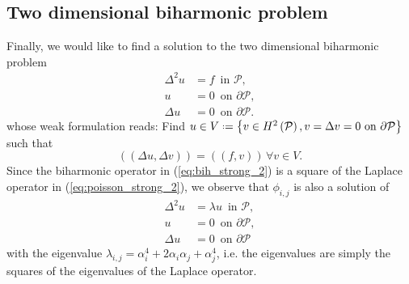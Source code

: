 \documentclass[a4paper,10pt]{article}
\newcommand{\Inner}[2]{\ensuremath{\left(\left(#1, #2\right)\right)}}
\newcommand*{\defeq}{\mathrel{\vcenter{\baselineskip0.5ex \lineskiplimit0pt
                     \hbox{\scriptsize.}\hbox{\scriptsize.}}}%
                     =}
\begin{document}
  \subsection{Two dimensional biharmonic problem}
  Finally, we would like to find a solution to the two dimensional biharmonic
  problem
  \begin{equation}
  \label{eq:bih_strong_2}
  \begin{aligned}
    \Delta^2 u &= f\,\text{ in }\mathcal{P},\\
            u &= 0\,\text{ on }\partial\mathcal{P},\\
    \Delta u &= 0\,\text{ on }\partial\mathcal{P}.
  \end{aligned}
  \end{equation}
  whose weak formulation reads: Find $u\in V\defeq\left\{v\in
    H^2\left(\mathcal{P}\right), v=\Delta{v}=0\text{ on
}\partial\mathcal{P}\right\}$ such that 
  \begin{equation}
  \label{eq:bih_weak_2}
  \Inner{\Delta u}{\Delta v} = \Inner{f}{v}\,\forall v \in V.
  \end{equation}
  Since the biharmonic operator in (\ref{eq:bih_strong_2}) is a square of the
  Laplace operator in (\ref{eq:poisson_strong_2}), we observe that $\phi_{i, j}$
  is also a solution of
  \[
  \begin{aligned}
    \Delta^2 u &= \lambda u \,\text{ in }\mathcal{P},\\
            u &= 0\,\text{ on }\partial\mathcal{P},\\
    \Delta u &= 0\,\text{ on }\partial\mathcal{P}
  \end{aligned}
  \]
  with the eigenvalue $\lambda_{i, j} = \alpha_i^4 + 2\alpha_i\alpha_j +
  \alpha_j^4$, i.e. the eigenvalues are simply the squares of the
  eigenvalues of the Laplace operator.
\end{document}
